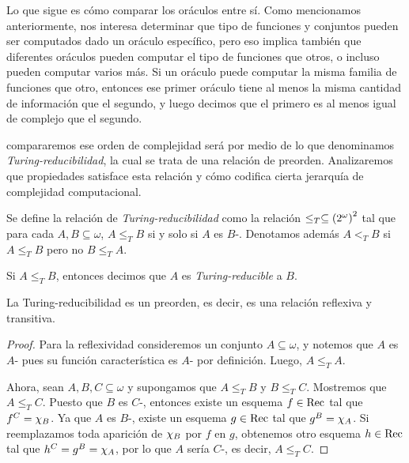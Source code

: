 Lo que sigue es cómo comparar los oráculos entre sí. Como mencionamos anteriormente, nos interesa determinar que tipo de funciones y conjuntos pueden ser computados dado un oráculo específico, pero eso implica también que diferentes oráculos pueden computar el  tipo de funciones que otros, o incluso pueden computar varios más. Si un oráculo puede computar la misma familia de funciones que otro, entonces ese primer oráculo tiene al menos la misma cantidad de información que el segundo, y luego decimos que el primero es al menos igual de complejo que el segundo.

 compararemos ese orden de complejidad será por medio de lo que denominamos \emph{Turing-reducibilidad}, la cual se trata de una relación de preorden. Analizaremos que propiedades satisface esta relación y cómo codifica cierta jerarquía de complejidad computacional.

\begin{definition}
	Se define la relación de \emph{Turing-reducibilidad} como la relación $\leq_{T}\subseteq\pa*{\CPOTENCIA{\omega}}^{2}$ tal que para cada $A, B\subseteq\omega$, $A\leq_{T} B$ si y solo si $A$ es $B$-. Denotamos además $A <_{T} B$ si $A\leq_{T} B$ pero no  $B\leq_{T} A$.

	Si $A\leq_{T} B$, entonces decimos que $A$ es \emph{Turing-reducible} a $B$.
\end{definition}

\begin{theorem}
	La Turing-reducibilidad es un preorden, es decir, es una relación reflexiva y transitiva.
\end{theorem}

\begin{proof}
	Para la reflexividad consideremos un conjunto $A\subseteq\omega$, y notemos que $A$ es $A$- pues su función característica es $A$- por definición. Luego, $A\leq_{T} A$.

	Ahora, sean $A, B, C\subseteq\omega$ y supongamos que $A\leq_{T} B$ y $B\leq_{T} C$. Mostremos que $A\leq_{T} C$. Puesto que $B$ es $C$-, entonces existe un esquema $f\in\RECURSIVO$ tal que $f^{C} =\CARACTERISTICA{B}$. Ya que $A$ es $B$-, existe un esquema $g\in\RECURSIVO$ tal que $g^{B} =\CARACTERISTICA{A}$. Si reemplazamos toda aparición de $\CARACTERISTICA{B}$ por $f$ en $g$, obtenemos otro esquema $h\in\RECURSIVO$ tal que $h^{C} = g^{B} =\CARACTERISTICA{A}$, por lo que $A$ sería $C$-, es decir, $A\leq_{T} C$.
\end{proof}

